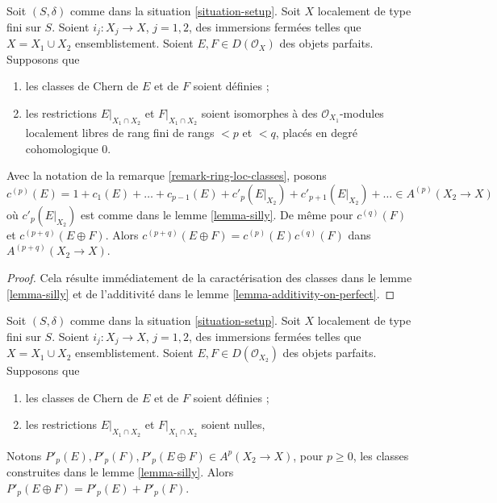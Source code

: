 \begin{lemma}
\label{lemma-silly-sum-c}
Soit $(S, \delta)$ comme dans la situation \ref{situation-setup}. Soit $X$
localement de type fini sur $S$. Soient $i_j : X_j \to X$, $j = 1, 2$,
des immersions fermées telles que $X = X_1 \cup X_2$ ensemblistement. Soient
$E, F \in D(\mathcal{O}_X)$ des objets parfaits. Supposons que
\begin{enumerate}
\item les classes de Chern de $E$ et de $F$ soient définies ;
\item les restrictions $E|_{X_1 \cap X_2}$ et $F|_{X_1 \cap X_2}$
soient isomorphes à des $\mathcal{O}_{X_1}$-modules localement libres de rang fini
de rangs $< p$ et $< q$, placés en degré cohomologique $0$.
\end{enumerate}
Avec la notation de la remarque \ref{remark-ring-loc-classes}, posons
$$
c^{(p)}(E) = 1 + c_1(E) + \ldots + c_{p - 1}(E) +
c'_p(E|_{X_2}) + c'_{p + 1}(E|_{X_2}) + \ldots \in A^{(p)}(X_2 \to X)
$$
où $c'_p(E|_{X_2})$ est comme dans le lemme \ref{lemma-silly}. De même
pour $c^{(q)}(F)$ et $c^{(p + q)}(E \oplus F)$.
Alors $c^{(p + q)}(E \oplus F) = c^{(p)}(E)c^{(q)}(F)$
dans $A^{(p + q)}(X_2 \to X)$.
\end{lemma}

\begin{proof}
Cela résulte immédiatement de la caractérisation des classes dans le
lemme \ref{lemma-silly} et de l'additivité dans le
lemme \ref{lemma-additivity-on-perfect}.
\end{proof}

\begin{lemma}
\label{lemma-silly-sum-P}
Soit $(S, \delta)$ comme dans la situation \ref{situation-setup}. Soit $X$
localement de type fini sur $S$. Soient $i_j : X_j \to X$, $j = 1, 2$,
des immersions fermées telles que $X = X_1 \cup X_2$ ensemblistement. Soient
$E, F \in D(\mathcal{O}_{X_2})$ des objets parfaits. Supposons que
\begin{enumerate}
\item les classes de Chern de $E$ et de $F$ soient définies ;
\item les restrictions $E|_{X_1 \cap X_2}$ et $F|_{X_1 \cap X_2}$ soient nulles,
\end{enumerate}
Notons $P'_p(E), P'_p(F), P'_p(E \oplus F) \in A^p(X_2 \to X)$, pour $p \geq 0$,
les classes construites dans le lemme \ref{lemma-silly}. Alors
$P'_p(E \oplus F) = P'_p(E) + P'_p(F)$.
\end{lemma}

